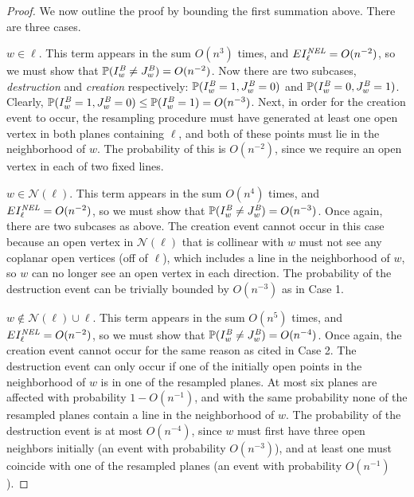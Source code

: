 \documentclass{amsart}
\newcommand{\vect}[1]{{ #1}}
\newcommand{\prob}{\mathbb{P}}
\newcommand{\B}{I^{\text{\em B}}}
\newcommand{\NEL}{I^{\text{\em NEL}}}
\newcommand{\JB}{J^{\text{\em B}}}
\numberwithin{equation}{section}
\newcommand{\Ln}{\ell}
\theoremstyle{definition}
\theoremstyle{remark}
\begin{document}
\begin{proof}
We now outline the proof by bounding the first summation above.  There are three cases.

 $\vect{w}\in \Ln$.  This term appears in the sum $O(n^3)$ times, and $E\NEL_\Ln = O(n^{-2})$, so we must show that $\prob{(\B_{\vect{w}} \neq \JB_{\vect{w}})} = O(n^{-2})$.  Now there are two subcases, {\em destruction} and {\em creation} respectively: $\prob{(\B_{\vect{w}} = 1, \JB_{\vect{w}} = 0)}$ and $\prob{(\B_{\vect{w}} = 0, \JB_{\vect{w}} = 1)}$.  Clearly, $\prob{(\B_{\vect{w}} = 1, \JB_{\vect{w}} = 0)}\leq \prob{(\B_{\vect{w}} = 1)} = O(n^{-3})$.  Next, in order for the creation event to occur, the resampling procedure must have generated at least one open vertex in both planes containing $\Ln$, and both of these points must lie in the neighborhood of $\vect{w}$.  The probability of this is $O(n^{-2})$, since we require an open vertex in each of two fixed lines.

 $\vect{w} \in \mathcal{N}(\Ln)$.  This term appears in the sum $O(n^4)$ times, and $E\NEL_\Ln = O(n^{-2})$, so we must show that $\prob{(\B_{\vect{w}} \neq \JB_{\vect{w}})} = O(n^{-3})$.  Once again, there are two subcases as above.  The creation event cannot occur in this case because an open vertex in $\mathcal{N}(\Ln)$ that is collinear with $\vect{w}$ must not see any coplanar open vertices (off of $\Ln$), which includes a line in the neighborhood of $\vect{w}$, so $\vect{w}$ can no longer see an open vertex in each direction.  The probability of the destruction event can be trivially bounded by $O(n^{-3})$ as in Case 1.

 $\vect{w} \notin \mathcal{N}(\Ln) \cup \Ln$.  This term appears in the sum $O(n^5)$ times, and $E\NEL_\Ln = O(n^{-2})$, so we must show that $\prob{(\B_{\vect{w}} \neq \JB_{\vect{w}})} = O(n^{-4})$.  Once again, the creation event cannot occur for the same reason as cited in Case 2.  The destruction event can only occur if one of the initially open points in the neighborhood of $\vect{w}$ is in one of the resampled planes.  At most six planes are affected with probability $1-O(n^{-1})$, and with the same probability none of the resampled planes contain a line in the neighborhood of $\vect{w}$.  The probability of the destruction event is at most $O(n^{-4})$, since $\vect{w}$ must first have three open neighbors initially (an event with probability $O(n^{-3})$), and at least one must coincide with one of the resampled planes (an event with probability $O(n^{-1})$).  
\end{proof}
\end{document}
